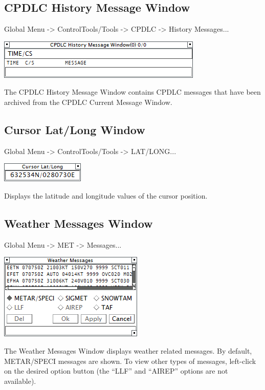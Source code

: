 \documentclass[11pt,a4paper]{memoir}
\begin{document}
\subsection{CPDLC History Message Window}
\label{win:dlhmw}

Global Menu -> ControlTools/Tools -> CPDLC -> History Messages...

\includegraphics{img/dlhmw.png}

The CPDLC History Message Window contains CPDLC messages that have been archived from the CPDLC
Current Message Window.

\subsection{Cursor Lat/Long Window}
\label{win:latlon}

Global Menu -> ControlTools/Tools -> LAT/LONG...

\includegraphics{img/latlon.png}

Displays the latitude and longitude values of the cursor position.

\subsection{Weather Messages Window}
\label{win:wxmw}

Global Menu -> MET -> Messages...

\includegraphics{img/wxmsg.png}

The Weather Messages Window displays weather related messages. By default, METAR/SPECI messages are shown. To view other types of messages, left-click on the desired option button (the “LLF” and “AIREP” options are not available).
\end{document}

